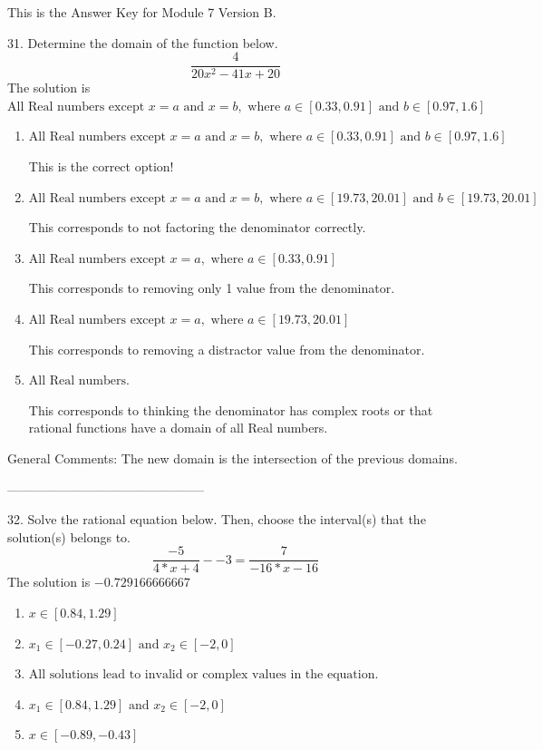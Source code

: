 \documentclass{article}[10pt]
\begin{document}
This is the Answer Key for Module 7 Version B.

31. Determine the domain of the function below.
$$ \frac{4}{20 x^2 - 41 x + 20} $$ 
The solution is $ \text{All Real numbers except } x = a \text{ and } x = b, \text{ where } a \in [0.33, 0.91] \text{ and } b \in [0.97, 1.6] $ 

\begin{enumerate}[label=\Alph*.] 
\item $ \text{All Real numbers except } x = a \text{ and } x = b, \text{ where } a \in [0.33, 0.91] \text{ and } b \in [0.97, 1.6] $ 

 This is the correct option! 
\item $ \text{All Real numbers except } x = a \text{ and } x = b, \text{ where } a \in [19.73, 20.01] \text{ and } b \in [19.73, 20.01] $ 

 This corresponds to not factoring the denominator correctly. 
\item $ \text{All Real numbers except } x = a, \text{ where } a \in [0.33, 0.91] $ 

 This corresponds to removing only 1 value from the denominator. 
\item $ \text{All Real numbers except } x = a, \text{ where } a \in [19.73, 20.01] $ 

 This corresponds to removing a distractor value from the denominator. 
\item $ \text{All Real numbers.} $ 

 This corresponds to thinking the denominator has complex roots or that rational functions have a domain of all Real numbers. 
\end{enumerate} 
 
General Comments: The new domain is the intersection of the previous domains.

-----------------------------------------------

32. Solve the rational equation below. Then, choose the interval(s) that the solution(s) belongs to.
$$ \frac{-5}{4*x + 4} - -3 = \frac{7}{-16*x - 16} $$ 
The solution is $ -0.729166666667 $ 

\begin{enumerate}[label=\Alph*.] 
\item $ x \in [0.84,1.29] $ 

  
\item $ x_1 \in [-0.27, 0.24] \text{ and } x_2 \in [-2,0] $ 

  
\item $ \text{All solutions lead to invalid or complex values in the equation.} $ 

  
\item $ x_1 \in [0.84, 1.29] \text{ and } x_2 \in [-2,0] $ 

  
\item $ x \in [-0.89,-0.43] $ 

  
\end{enumerate} 
 
\end{document}
